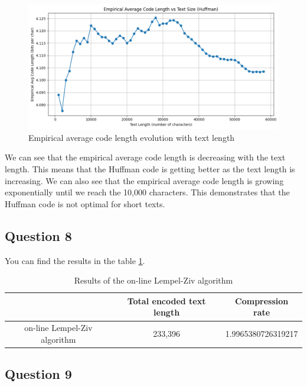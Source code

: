 \documentclass[]{template}
\begin{document}
    \begin{figure}[ht]
        \centering
        \includegraphics[width=1\textwidth]{Images/evolution_avg_code_length.png}
        \caption{Empirical average code length evolution with text length}\label{fig:evolution_avg_code_length}
    \end{figure}

    \noindent
    We can see that the empirical average code length is decreasing with the text length.
    This means that the Huffman code is getting better as the text length is increasing.
    We can also see that the empirical average code length is growing exponentially until we reach the 10,000 characters.
    This demonstrates that the Huffman code is not optimal for short texts.

    \subsection{Question 8}

    You can find the results in the table \ref{tab:online_lz77}.

    \begin{table}[ht]
        \centering
        \begin{tabular}{|c|c|c|}
        \hline
                                     & Total encoded text length & Compression rate   \\ \hline
        on-line Lempel-Ziv algorithm & 233,396                   & 1.9965380726319217 \\ \hline
        \end{tabular}
        \caption{Results of the on-line Lempel-Ziv algorithm}\label{tab:online_lz77}
    \end{table}

    \subsection{Question 9}
\end{document}
